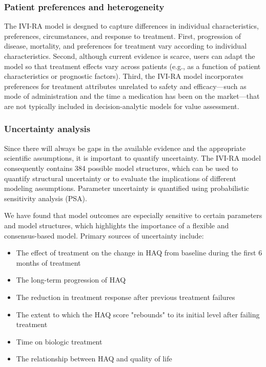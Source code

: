 \documentclass[11pt,final,fleqn]{article}\usepackage[]{graphicx}\usepackage[]{color}
\theoremstyle{plain}
\begin{document}
\subsubsection*{Patient preferences and heterogeneity}
The IVI-RA model is desgned to capture differences in individual characteristics, preferences, circumstances, and response to treatment. First, progression of disease, mortality, and preferences for treatment vary according to individual characteristics. Second, although current evidence is scarce, users can adapt the model so that treatment effects vary across patients (e.g., as a function of patient characteristics or prognostic factors). Third, the IVI-RA model incorporates preferences for treatment attributes unrelated to safety and efficacy---such as mode of administration and the time a medication has been on the market---that are not typically included in decision-analytic models for value assessment.  

\subsubsection*{Uncertainty analysis}
Since there will always be gaps in the available evidence and the appropriate scientific assumptions, it is important to quantify uncertainty. The IVI-RA model consequently contains 384 possible model structures, which can be used to quantify structural uncertainty or to evaluate the implications of different modeling assumptions. Parameter uncertainty is quantified using probabilistic sensitivity analysis (PSA). 

We have found that model outcomes are especially sensitive to certain parameters and model structures, which highlights the importance of a flexible and consensus-based model. Primary sources of uncertainty include:

\begin{itemize}
\item The effect of treatment on the change in HAQ from baseline during the first 6 months of treatment
\item The long-term progression of HAQ
\item The reduction in treatment response after previous treatment failures
\item The extent to which the HAQ score "rebounds" to its initial level after failing treatment
\item Time on biologic treatment
\item The relationship between HAQ and quality of life
\end{itemize}
\end{document}
